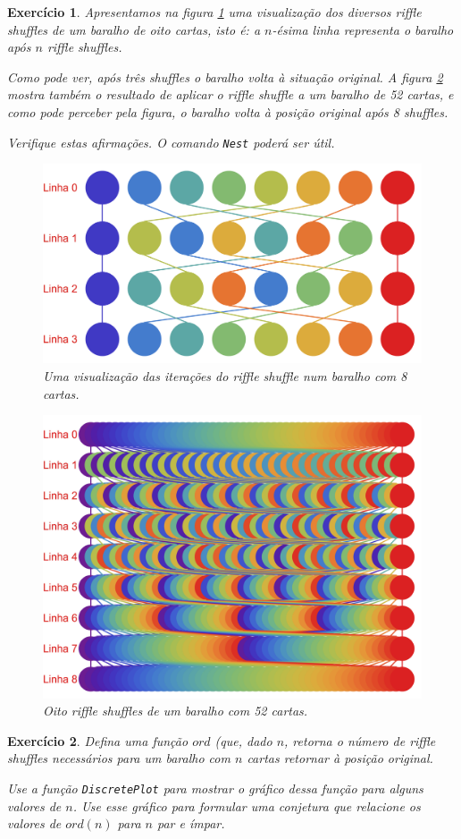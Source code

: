 \documentclass{article}
\newtheorem{ex}{Exercício}
\begin{document}
\begin{ex}
Apresentamos na figura \ref{shuffle8} uma visualização dos diversos riffle shuffles de um baralho de oito cartas, isto é: a $n$-ésima linha representa o baralho após $n$ riffle shuffles.

Como pode ver, após três shuffles o baralho volta à situação original. A figura \ref{shuffle52} mostra também o resultado de aplicar o riffle shuffle a um baralho de 52 cartas, e como pode perceber pela figura, o baralho volta à posição original após 8 shuffles.

Verifique estas afirmações. O comando \texttt{Nest} poderá ser útil.

\begin{figure}
\centering
\includegraphics[width=.75\textwidth]{shuffle8}
\caption{Uma visualização das iterações do riffle shuffle num baralho com 8 cartas.}\label{shuffle8}
\end{figure}

\begin{figure}
\centering
\includegraphics[width=.75\textwidth]{shuffle52}
\caption{Oito riffle shuffles de um baralho com 52 cartas.}\label{shuffle52}
\end{figure}
\end{ex}

\begin{ex}
Defina uma função $ord$ (que, dado $n$, retorna o número de riffle shuffles necessários para um baralho com $n$ cartas retornar à posição original.

Use a função \texttt{DiscretePlot} para mostrar o gráfico dessa função para alguns valores de $n$. Use esse gráfico para formular uma conjetura que relacione os valores de $ord(n)$ para $n$ par e ímpar.
\end{ex}
\end{document}
